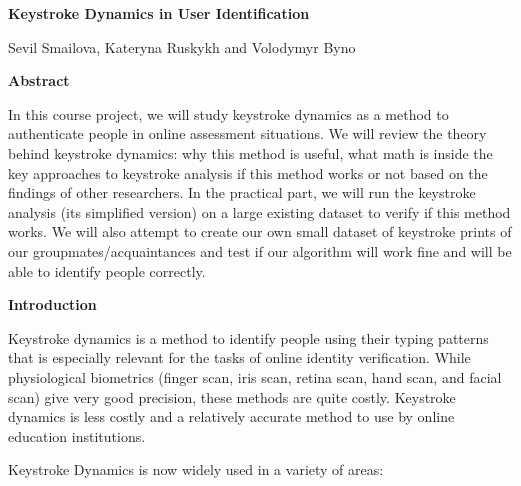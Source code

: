 \documentclass[12pt,a4]{article}
\begin{document}
\begin{center}
  \Huge\bf{Keystroke Dynamics in User Identification}
\end{center}

\begin{center}
	Sevil Smailova, Kateryna Ruskykh and Volodymyr Byno
\end{center}

\large\textbf{Abstract}
\bigskip

\normalsize
In this course project, we will study keystroke dynamics as a method to authenticate people in online assessment situations. We will review the theory behind keystroke dynamics: why this method is useful, what math is inside the key approaches to keystroke analysis if this method works or not based on the findings of other researchers. In the practical part, we will run the keystroke analysis (its simplified version) on a large existing dataset to verify if this method works. We will also attempt to create our own small dataset of keystroke prints of our groupmates/acquaintances and test if our algorithm will work fine and will be able to identify people correctly. 
\bigskip

\large\textbf{Introduction}
\bigskip

\normalsize
Keystroke dynamics is a method to identify people using their typing patterns that is especially relevant for the tasks of online identity verification. While physiological biometrics (finger scan, iris scan, retina scan, hand scan, and facial scan) give very good precision, these methods are quite costly. Keystroke dynamics is less costly and a relatively accurate method to use by online education institutions. 

Keystroke Dynamics is now widely used in a variety of areas:
\end{document}
